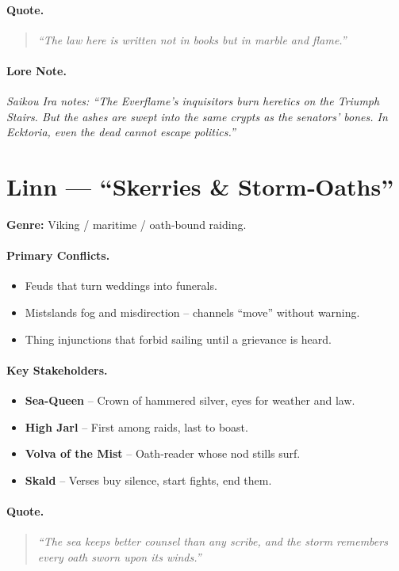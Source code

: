 \paragraph{Quote.}
\begin{quote}
\emph{“The law here is written not in books but in marble and flame.”}
\end{quote}

\paragraph{Lore Note.}
\emph{Saikou Ira notes: “The Everflame’s inquisitors burn heretics on the Triumph Stairs. But the ashes are swept into the same crypts as the senators’ bones. In Ecktoria, even the dead cannot escape politics.”}

\section{Linn — “Skerries \& Storm‑Oaths”}
\textbf{Genre:} Viking / maritime / oath‑bound raiding.

\paragraph{Primary Conflicts.}
\begin{itemize}
  \item Feuds that turn weddings into funerals.
  \item Mistslands fog and misdirection – channels “move” without warning.
  \item Thing injunctions that forbid sailing until a grievance is heard.
\end{itemize}

\paragraph{Key Stakeholders.}
\begin{itemize}
  \item \textbf{Sea-Queen} – Crown of hammered silver, eyes for weather and law.
  \item \textbf{High Jarl} – First among raids, last to boast.
  \item \textbf{Volva of the Mist} – Oath‑reader whose nod stills surf.
  \item \textbf{Skald} – Verses buy silence, start fights, end them.
\end{itemize}

\paragraph{Quote.}
\begin{quote}
\emph{“The sea keeps better counsel than any scribe, and the storm remembers every oath sworn upon its winds.”}
\end{quote}

